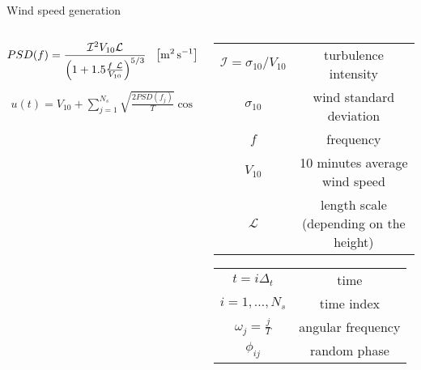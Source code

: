 \begin{frame}{Wind speed generation}

  \begin{columns}
    \begin{column}{0.5\columnwidth}
      { \scriptsize
        \begin{equation*}
            PSD(f) = \frac{\mathcal{I} ^2V_{10}\mathcal{L} }{\left(1+1.5\frac{f \ \mathcal{L} }{V_{10}}\right)^{5/3}} \ \ \left[\si{\square \meter \per \second}\right]
            \label{eq:PSD}
        \end{equation*}
        \begin{gather*}
            u(t) = V_{10}+\sum_{j=1}^{N_s}\sqrt{\frac{2PSD(f_j)}{T}}\cos{(\omega_jt-\varphi_j)} \ \ \left[\si{\meter \per \second}\right]
            \label{eq:wind_series}
        \end{gather*}
      }
    \end{column}
    \begin{column}{0.5\columnwidth}
    {\tiny

      \begin{table}
        \begin{tabular}{cc}
          \toprule
          $\mathcal{I}=\sigma_{10}/V_{10}$ & turbulence intensity\\
          $\sigma_{10}$ & wind standard deviation\\
          $f$ & frequency\\
          $V_{10}$ & 10 minutes average wind speed\\
          $\mathcal{L}$ & length scale (depending on the height)\\
          \bottomrule
        \end{tabular}
      \end{table}

      \begin{table}
        \begin{tabular}{cc}
          \toprule
          $t=i\Delta_t$ & time\\
          $i=1,\dots,N_s$ & time index\\
          $\omega_j=\frac{j}{T}$ & angular frequency\\
          $\phi_{ij}$ & random phase\\
          \bottomrule
        \end{tabular}
      \end{table}
    }
    \end{column}
  \end{columns}


\end{frame}
